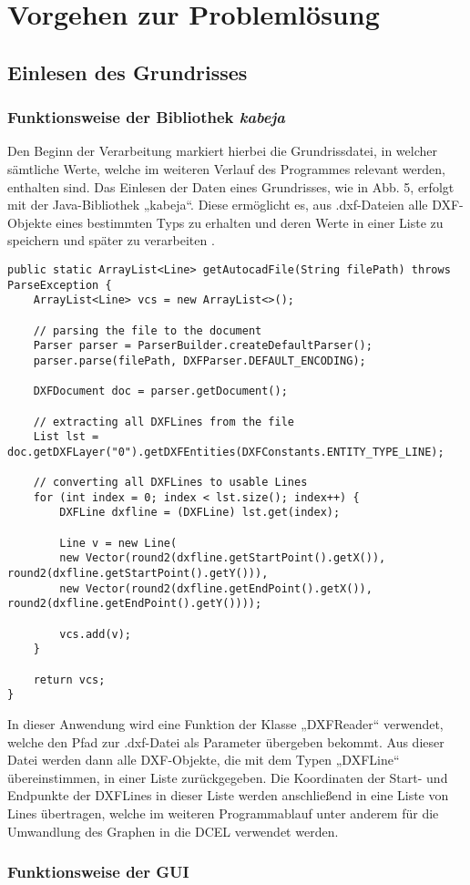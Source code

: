\chapter{Vorgehen zur Problemlösung}
\section{Einlesen des Grundrisses}
\subsection{Funktionsweise der Bibliothek \textit{kabeja}}
Den Beginn der Verarbeitung markiert hierbei die Grundrissdatei, in welcher sämtliche Werte, welche im weiteren Verlauf des Programmes relevant werden, enthalten sind.
Das Einlesen der Daten eines Grundrisses, wie in Abb. 5, erfolgt mit der Java-Bibliothek „kabeja“. 
Diese ermöglicht es, aus .dxf-Dateien alle DXF-Objekte eines bestimmten Typs zu erhalten und deren Werte in einer Liste zu speichern und später zu verarbeiten \cite{kabeja}.
\begin{lstlisting}[caption = {DXF File Parser}]
public static ArrayList<Line> getAutocadFile(String filePath) throws ParseException {
	ArrayList<Line> vcs = new ArrayList<>();
	
	// parsing the file to the document
	Parser parser = ParserBuilder.createDefaultParser();
	parser.parse(filePath, DXFParser.DEFAULT_ENCODING);
	
	DXFDocument doc = parser.getDocument();
	
	// extracting all DXFLines from the file
	List lst = doc.getDXFLayer("0").getDXFEntities(DXFConstants.ENTITY_TYPE_LINE);
	
	// converting all DXFLines to usable Lines
	for (int index = 0; index < lst.size(); index++) {
		DXFLine dxfline = (DXFLine) lst.get(index);
		
		Line v = new Line(
		new Vector(round2(dxfline.getStartPoint().getX()), round2(dxfline.getStartPoint().getY())),
		new Vector(round2(dxfline.getEndPoint().getX()), round2(dxfline.getEndPoint().getY())));
		
		vcs.add(v);
	}
	
	return vcs;
}
\end{lstlisting}
In dieser Anwendung wird eine Funktion der Klasse „DXFReader“ verwendet, welche den Pfad zur .dxf-Datei als Parameter übergeben bekommt. 
Aus dieser Datei werden dann alle DXF-Objekte, die mit dem Typen „DXFLine“ übereinstimmen, in einer Liste zurückgegeben. 
Die Koordinaten der Start- und Endpunkte der DXFLines  in dieser Liste werden anschließend in eine Liste von Lines übertragen, welche im weiteren Programmablauf unter anderem für die Umwandlung des Graphen in die DCEL verwendet werden.
\subsection{Funktionsweise der GUI}
